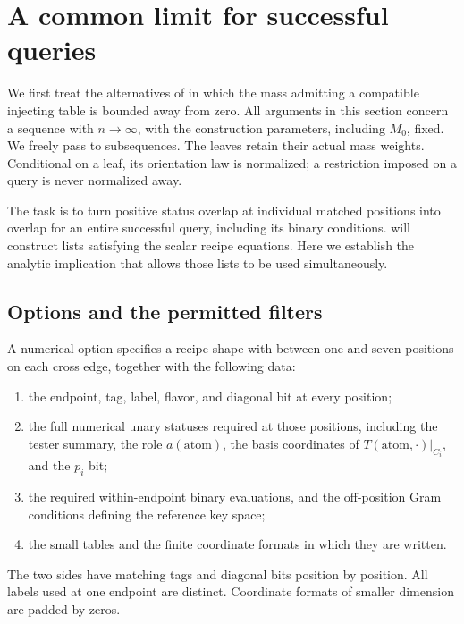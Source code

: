 \section{A common limit for successful queries}
\label{sec:common-limit}

We first treat the alternatives of  in which
the mass admitting a compatible injecting table is bounded away from zero.
All arguments in this section concern a sequence with $n\to\infty$, with
the construction parameters, including $M_0$, fixed. We freely pass to
subsequences. The leaves retain their actual mass weights. Conditional on
a leaf, its orientation law is normalized; a restriction imposed on a
query is never normalized away.

The task is to turn positive status overlap at individual matched
positions into overlap for an entire successful query, including its
binary conditions.  will construct lists satisfying
the scalar recipe equations. Here we establish the analytic implication
that allows those lists to be used simultaneously.

\subsection{Options and the permitted filters}

\begin{definition}
\label{def:limit-option}
A numerical option specifies a recipe shape with between one and seven
positions on each cross edge, together with the following data:
\begin{enumerate}
\item the endpoint, tag, label, flavor, and diagonal bit at every position;
\item the full numerical unary statuses required at those positions,
including the tester summary, the role $a(\mathrm{atom})$, the basis
coordinates of $T(\mathrm{atom},\cdot)|_{C_i}$, and the $p_i$ bit;
\item the required within-endpoint binary evaluations, and the
off-position Gram conditions defining the reference key space;
\item the small tables and the finite coordinate formats in which they
are written.
\end{enumerate}
The two sides have matching tags and diagonal bits position by position.
All labels used at one endpoint are distinct. Coordinate formats of
smaller dimension are padded by zeros.
\end{definition}

